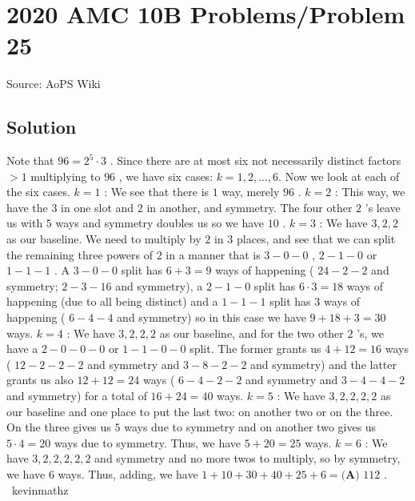 \documentclass[12pt]{article}
\begin{document}
\section*{{2020 AMC 10B Problems/Problem 25}}
Source: AoPS Wiki

\subsection*{Solution}
Note that $96 = 2^5 \cdot 3$ . Since there are at most six not necessarily distinct factors $>1$ multiplying to $96$ , we have six cases: $k=1, 2, ..., 6.$ Now we look at each of the six cases. $k=1$ : We see that there is $1$ way, merely $96$ . $k=2$ : This way, we have the $3$ in one slot and $2$ in another, and symmetry. The four other $2$ 's leave us with $5$ ways and symmetry doubles us so we have $10$ . $k=3$ : We have $3, 2, 2$ as our baseline. We need to multiply by $2$ in $3$ places, and see that we can split the remaining three powers of $2$ in a manner that is $3-0-0$ , $2-1-0$ or $1-1-1$ . A $3-0-0$ split has $6 + 3 = 9$ ways of happening ( $24-2-2$ and symmetry; $2-3-16$ and symmetry), a $2-1-0$ split has $6 \cdot 3 = 18$ ways of happening (due to all being distinct) and a $1-1-1$ split has $3$ ways of happening ( $6-4-4$ and symmetry) so in this case we have $9+18+3=30$ ways. $k=4$ : We have $3, 2, 2, 2$ as our baseline, and for the two other $2$ 's, we have a $2-0-0-0$ or $1-1-0-0$ split. The former grants us $4+12=16$ ways ( $12-2-2-2$ and symmetry and $3-8-2-2$ and symmetry) and the latter grants us also $12+12=24$ ways ( $6-4-2-2$ and symmetry and $3-4-4-2$ and symmetry) for a total of $16+24=40$ ways. $k=5$ : We have $3, 2, 2, 2, 2$ as our baseline and one place to put the last two: on another two or on the three. On the three gives us $5$ ways due to symmetry and on another two gives us $5 \cdot 4 = 20$ ways due to symmetry. Thus, we have $5+20=25$ ways. $k=6$ : We have $3, 2, 2, 2, 2, 2$ and symmetry and no more twos to multiply, so by symmetry, we have $6$ ways. Thus, adding, we have $1+10+30+40+25+6=\boxed{\textbf{(A) } 112}$ . ~kevinmathz
\end{document}
